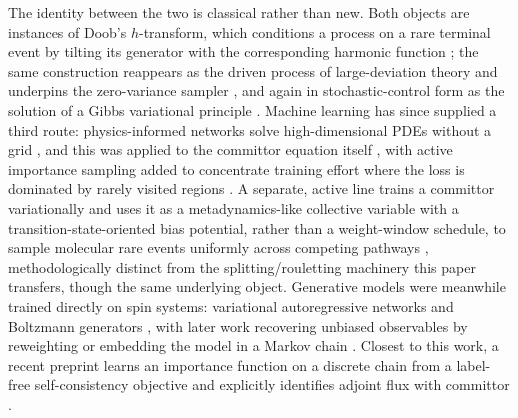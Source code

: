 \documentclass[11pt]{article}
\begin{document}
	The identity between the two is classical rather than new. Both objects are instances of
	Doob's $h$-transform, which conditions a process on a rare terminal event by tilting its
	generator with the corresponding harmonic function \cite{doob1984}; the same construction
	reappears as the driven process of large-deviation theory and underpins the zero-variance
	sampler \cite{chetrite2015, touchette2009}, and again in stochastic-control form as the
	solution of a Gibbs variational principle \cite{hartmann2019}. Machine learning has since
	supplied a third route: physics-informed networks solve high-dimensional PDEs without a
	grid \cite{raissi2019}, and this was applied to the committor equation itself
	\cite{li2019, khoo2019}, with active importance sampling added to concentrate training
	effort where the loss is dominated by rarely visited regions \cite{rotskoff2020}. A
	separate, active line trains a committor variationally and uses it as a metadynamics-like
	collective variable with a transition-state-oriented bias potential, rather than a
	weight-window schedule, to sample molecular rare events uniformly across competing
	pathways \cite{trizio2025}, methodologically distinct from the splitting/rouletting
	machinery this paper transfers, though the same underlying object.
	Generative models were meanwhile trained directly on spin systems: variational
	autoregressive networks \cite{wu2019} and Boltzmann generators \cite{noe2019}, with
	later work recovering unbiased observables by reweighting \cite{nicoli2020} or embedding
	the model in a Markov chain \cite{gabrie2022}. Closest to this work, a recent preprint
	learns an importance function on a discrete chain from a label-free self-consistency
	objective and explicitly identifies adjoint flux with committor \cite{kim2026}.
	
\end{document}
